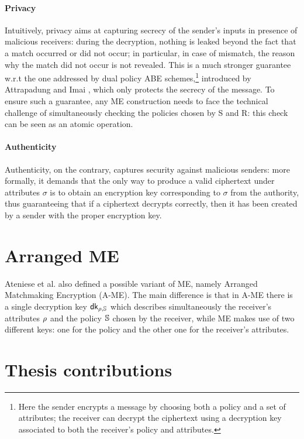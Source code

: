 \paragraph{Privacy}
Intuitively, privacy aims at capturing secrecy of the sender’s inputs in presence of malicious receivers: during the decryption, nothing is leaked beyond the fact that a match occurred or did not occur; in particular, in case of mismatch, the reason why the match did not occur is not revealed.
This is a much stronger guarantee w.r.t the one addressed by dual policy ABE schemes,\footnote{Here the sender encrypts a message by choosing both a policy and a set of attributes; the receiver can decrypt the ciphertext using a decryption key associated to both the receiver’s policy and attributes.} introduced by Attrapadung and Imai \cite{Attrapadung}, which only protects the secrecy of the message.
To ensure such a guarantee, any ME construction needs to face the technical challenge of simultaneously checking the policies chosen by S and R: this check can be seen as an atomic operation.

\paragraph{Authenticity}
Authenticity, on the contrary, captures security against malicious senders: more formally, it demands that the only way to produce a valid ciphertext under attributes $\sigma$ is to obtain an encryption key corresponding to $\sigma$ from the authority, thus guaranteeing that if a ciphertext decrypts correctly, then it has been created by a sender with the proper encryption key.

\section{Arranged ME}
Ateniese et al. also defined a possible variant of ME, namely Arranged Matchmaking Encryption (A-ME).
The main difference is that in A-ME there is a single decryption key $\mathsf{dk}_{\rho,\mathbb{S}}$ which describes simultaneously the receiver's
attributes $\rho$ and the policy $\mathbb{S}$ chosen by the receiver, while ME makes use of two different keys: one for the policy and the other one for the receiver's attributes.

\section{Thesis contributions}
